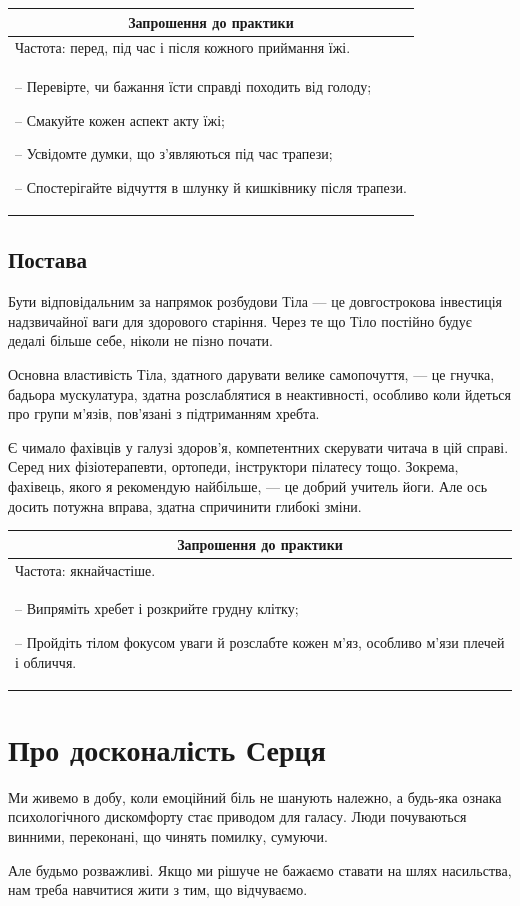 \documentclass[oneside, 12pt]{book}
\newenvironment{prat}[1]
{\begin{center}
\begin{tabular}{p{0.9\textwidth}}
\hline\hline
\multicolumn{1}{c}{Запрошення до практики}\\
\hline
Частота: #1.\\
\hline
}{\\
\hline\hline
\end{tabular} 
\end{center}}
\begin{document}
\begin{prat}{перед, під час і після кожного приймання їжі}
-- Перевірте, чи бажання їсти справді походить від голоду;

-- Смакуйте кожен аспект акту їжі;

-- Усвідомте думки, що з'являються під час трапези;

-- Спостерігайте відчуття в шлунку й кишківнику після трапези.
\end{prat}

\section*{Постава}

Бути відповідальним за напрямок розбудови Тіла --- це довгострокова інвестиція надзвичайної ваги для здорового старіння. Через те що Тіло постійно будує дедалі більше себе, ніколи не пізно почати.

Основна властивість Тіла, здатного дарувати велике самопочуття, --- це гнучка, бадьора мускулатура, здатна розслаблятися в неактивності, особливо коли йдеться про групи м'язів, пов'язані з підтриманням хребта.

Є чимало фахівців у галузі здоров'я, компетентних скерувати читача в цій справі. Серед них фізіотерапевти, ортопеди, інструктори пілатесу тощо. Зокрема, фахівець, якого я рекомендую найбільше, --- це добрий учитель йоги. Але ось досить потужна вправа, здатна спричинити глибокі зміни.

\begin{prat}{якнайчастіше}
-- Випряміть хребет і розкрийте грудну клітку;

-- Пройдіть тілом фокусом уваги й розслабте кожен м'яз, особливо м'язи плечей і обличчя.
\end{prat}

\chapter*{Про досконалість Серця}

Ми живемо в добу, коли емоційний біль не шанують належно, а будь-яка ознака психологічного дискомфорту стає приводом для галасу. Люди почуваються винними, переконані, що чинять помилку, сумуючи.

Але будьмо розважливі. Якщо ми рішуче не бажаємо ставати на шлях насильства, нам треба навчитися жити з тим, що відчуваємо.
\end{document}
